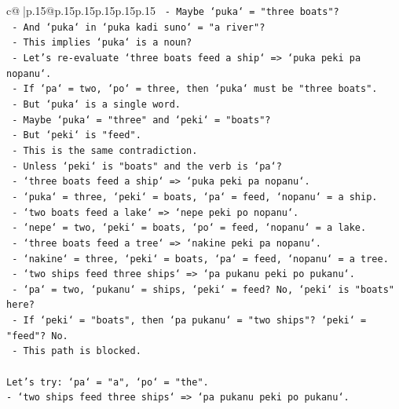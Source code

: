 \documentclass{article}
\begin{document}
{\begin{supertabular}{c@{$\;$}|p{.15\linewidth}@{}p{.15\linewidth}p{.15\linewidth}p{.15\linewidth}p{.15\linewidth}p{.15\linewidth}}
{{{\texttt{               {-} Maybe `puka` = "three boats"?} \\
\texttt{               {-} And `puka` in `puka kadi suno` = "a river"?} \\
\texttt{               {-} This implies `puka` is a noun?} \\
\texttt{               {-} Let's re{-}evaluate `three boats feed a ship` => `puka peki pa nopanu`.} \\
\texttt{                 {-} If `pa` = two, `po` = three, then `puka` must be "three boats".} \\
\texttt{                 {-} But `puka` is a single word.} \\
\texttt{                 {-} Maybe `puka` = "three" and `peki` = "boats"?} \\
\texttt{                 {-} But `peki` is "feed".} \\
\texttt{                 {-} This is the same contradiction.} \\
\texttt{                 {-} Unless `peki` is "boats" and the verb is `pa`?} \\
\texttt{                 {-} `three boats feed a ship` => `puka peki pa nopanu`.} \\
\texttt{                   {-} `puka` = three, `peki` = boats, `pa` = feed, `nopanu` = a ship.} \\
\texttt{                 {-} `two boats feed a lake` => `nepe peki po nopanu`.} \\
\texttt{                   {-} `nepe` = two, `peki` = boats, `po` = feed, `nopanu` = a lake.} \\
\texttt{                 {-} `three boats feed a tree` => `nakine peki pa nopanu`.} \\
\texttt{                   {-} `nakine` = three, `peki` = boats, `pa` = feed, `nopanu` = a tree.} \\
\texttt{                 {-} `two ships feed three ships` => `pa pukanu peki po pukanu`.} \\
\texttt{                   {-} `pa` = two, `pukanu` = ships, `peki` = feed? No, `peki` is "boats" here?} \\
\texttt{                   {-} If `peki` = "boats", then `pa pukanu` = "two ships"? `peki` = "feed"? No.} \\
\texttt{                   {-} This path is blocked.} \\
\\ 
\texttt{Let's try: `pa` = "a", `po` = "the".} \\
\texttt{{-} `two ships feed three ships` => `pa pukanu peki po pukanu`.} \\
}}}
\end{supertabular}}
\end{document}

